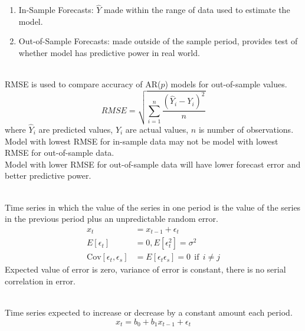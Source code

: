 \begin{remark} 
\begin{enumerate}[label=\roman*.]
\setlength{\itemsep}{0pt}
\item In-Sample Forecasts: $\hat{Y}$ made within the range of data used to estimate the model.
\item Out-of-Sample Forecasts: made outside of the sample period, provides test of whether model has predictive power in real world.
\end{enumerate}
\end{remark}

\begin{remark} \\
RMSE is used to compare accuracy of AR($p$) models for out-of-sample values.
\begin{equation}
RMSE = \sqrt{\sum\limits_{i=1}^n \frac{(\hat{Y}_i - Y_i)^2}{n}} \nonumber
\end{equation}
where $\hat{Y}_i$ are predicted values, $Y_i$ are actual values, $n$ is number of observations.\\
Model with lowest RMSE for in-sample data may not be model with lowest RMSE for out-of-sample data.\\
Model with lower RMSE for out-of-sample data will have lower forecast error and better predictive power.
\end{remark}

\begin{definition} \\
Time series in which the value of the series in one period is the value of the series in the previous period plus an unpredictable random error.
\begin{align}
x_t &= x_{t-1} + \epsilon_t \nonumber \\
E[\epsilon_t] &= 0, E[\epsilon_t^2] = \sigma^2 \nonumber \\
\text{Cov}[\epsilon_t, \epsilon_s] &= E[\epsilon_t \epsilon_s] = 0 \ \ \text{if} \ \ i \neq j \nonumber
\end{align}
Expected value of error is zero, variance of error is constant, there is no serial correlation in error.
\end{definition}

\begin{definition} \\
Time series expected to increase or decrease by a constant amount each period.
\begin{equation}
x_t = b_0 + b_1 x_{t-1} + \epsilon_t \nonumber
\end{equation}
\end{definition}

